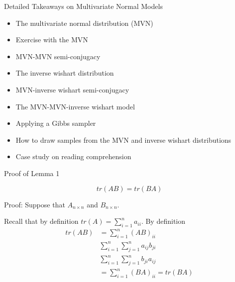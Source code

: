 \documentclass[
  ignorenonframetext,
]{beamer}
\providecommand{\tightlist}{%
  \setlength{\itemsep}{0pt}\setlength{\parskip}{0pt}}
\begin{document}
\begin{frame}{Detailed Takeaways on Multivariate Normal Models}
\protect\hypertarget{detailed-takeaways-on-multivariate-normal-models}{}

\begin{itemize}
\tightlist
\item
  The multivariate normal distribution (MVN)
\item
  Exercise with the MVN
\item
  MVN-MVN semi-conjugacy
\item
  The inverse wishart distribution
\item
  MVN-inverse wishart semi-conjugacy
\item
  The MVN-MVN-inverse wishart model
\item
  Applying a Gibbs sampler
\item
  How to draw samples from the MVN and inverse wishart distributions
\item
  Case study on reading comprehension
\end{itemize}

\end{frame}

\begin{frame}{Proof of Lemma 1}
\protect\hypertarget{proof-of-lemma-1}{}

\[tr(AB) = tr(BA)\]

Proof: Suppose that \(A_{n \times n}\) and \(B_{n \times n}.\)

Recall that by definition \(tr(A) = \sum_{i=1}^n a_{ii}.\) By definition
\begin{align}
tr(AB) &= \sum_{i=1}^n (AB)_{ii} \\
& \sum_{i=1}^n \sum_{j=1}^n a_{ij} b_{ji}\\
& \sum_{i=1}^n \sum_{j=1}^n b_{ji} a_{ij} \\
&= \sum_{i=1}^n (BA)_{ii} 
= tr(BA)
\end{align}

\end{frame}
\end{document}
